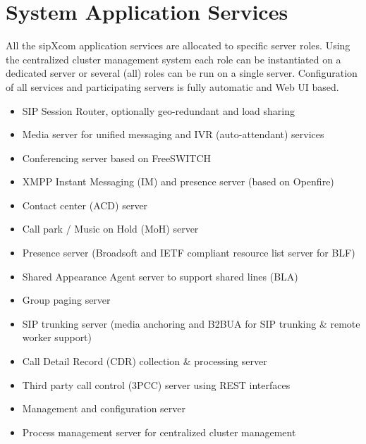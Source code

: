 \documentclass[letterpaper,10pt,english]{sphinxmanual}
\begin{document}
\section{System Application Services}
\label{\detokenize{features:system-application-services}}
All the sipXcom application services are allocated to specific server roles. Using the centralized cluster management system each role can be instantiated on a dedicated server or several (all) roles can be run on a single server. Configuration of all services and participating servers is fully automatic and Web UI based.
\begin{itemize}
\item {} 
SIP Session Router, optionally geo-redundant and load sharing

\item {} 
Media server for unified messaging and IVR (auto-attendant) services

\item {} 
Conferencing server based on FreeSWITCH

\item {} 
XMPP Instant Messaging (IM) and presence server (based on Openfire)

\item {} 
Contact center (ACD) server

\item {} 
Call park / Music on Hold (MoH) server

\item {} 
Presence server (Broadsoft and IETF compliant resource list server for BLF)

\item {} 
Shared Appearance Agent server to support shared lines (BLA)

\item {} 
Group paging server

\item {} 
SIP trunking server (media anchoring and B2BUA for SIP trunking \& remote worker support)

\item {} 
Call Detail Record (CDR) collection \& processing server

\item {} 
Third party call control (3PCC) server using REST interfaces

\item {} 
Management and configuration server

\item {} 
Process management server for centralized cluster management

\end{itemize}
\end{document}
